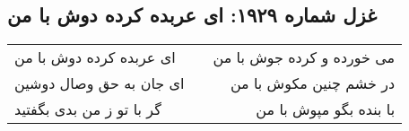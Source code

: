 \begin{center}
\section*{غزل شماره ۱۹۲۹: ای عربده کرده دوش با من}
\label{sec:1929}
\begin{longtable}{l p{0.5cm} r}
ای عربده کرده دوش با من
&&
می خورده و کرده جوش با من
\\
ای جان به حق وصال دوشین
&&
در خشم چنین مکوش با من
\\
گر با تو ز من بدی بگفتید
&&
با بنده بگو مپوش با من
\\
\end{longtable}
\end{center}

